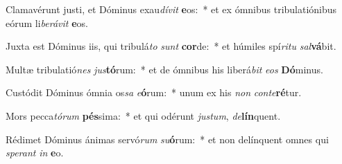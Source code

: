 \item Clamavérunt justi, et Dóminus exau\textit{dí}\textit{vit} \textbf{e}os:~* et ex ómnibus tribulatiónibus eórum li\textit{be}\textit{rá}\textit{vit} \textbf{e}os.
\item Juxta est Dóminus iis, qui tribulá\textit{to} \textit{sunt} \textbf{cor}de:~* et húmiles spí\textit{ri}\textit{tu} \textit{sal}\textbf{vá}bit.
\item Multæ tribulatió\textit{nes} \textit{jus}\textbf{tó}rum:~* et de ómnibus his liberá\textit{bit} \textit{e}\textit{os} \textbf{Dó}minus.
\item Custódit Dóminus ómnia os\textit{sa} \textit{e}\textbf{ó}rum:~* unum ex his \textit{non} \textit{con}\textit{te}\textbf{ré}tur.
\item Mors pecca\textit{tó}\textit{rum} \textbf{pés}sima:~* et qui odérunt \textit{jus}\textit{tum}, \textit{de}\textbf{lín}quent.
\item Rédimet Dóminus ánimas servó\textit{rum} \textit{su}\textbf{ó}rum:~* et non delínquent omnes qui \textit{spe}\textit{rant} \textit{in} \textbf{e}o.
